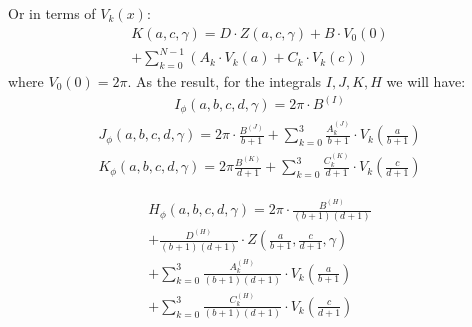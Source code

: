 Or in terms of $V_k(x)$:
\begin{equation}\begin{aligned}
K(a, c, \gamma) = D\cdot Z(a,c,\gamma) + B \cdot V_0(0)  \\ + \sum_{k=0}^{N-1} \left( A_k \cdot V_k(a) + C_k \cdot V_k(c) \right)
\end{aligned}\end{equation}
where $V_0(0) = 2 \pi$. As the result, for the integrals $I, J, K, H$ we will have:
\begin{equation}\begin{aligned}
I_{\phi}(a, b, c, d, \gamma) = 2\pi \cdot B^{(I)} 
\end{aligned}\end{equation}
\begin{equation}\begin{aligned}
J_{\phi}(a, b, c, d, \gamma) = 2\pi \cdot \frac{B^{(J)}}{b+1}  + \sum_{k=0}^{3} \frac{A_k^{(J)}} {b+1} \cdot V_k\left(\frac{a}{b+1}\right) 
\end{aligned}\end{equation}
\begin{equation}\begin{aligned}
K_{\phi}(a, b, c, d, \gamma) = 2\pi \frac{B^{(K)}}{d+1} + \sum_{k=0}^{3} \frac{C_k^{(K)}} {d+1} \cdot V_k\left(\frac{c}{d+1}\right) 
\end{aligned}\end{equation}

\begin{equation}\begin{aligned}
H_{\phi}(a, b, c, d, \gamma) = 2\pi \cdot \frac{B^{(H)}}{(b+1)(d+1)} \\+ \frac{D^{(H)}}{(b+1)(d+1)}\cdot Z\left(\frac{a}{b+1},\frac{c}{d+1},\gamma\right)  \\+\sum_{k=0}^{3} \frac{A_k^{(H)}} {(b+1)(d+1)} \cdot V_k\left(\frac{a}{b+1}\right) \\ + \sum_{k=0}^{3} \frac{C_k^{(H)}} {(b+1)(d+1)} \cdot V_k\left(\frac{c}{d+1}\right)
\end{aligned}\end{equation}